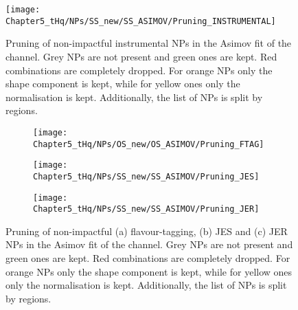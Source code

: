 \begin{figure}[h]
  \centering
  \texttt{[image: Chapter5\_tHq/NPs/SS\_new/SS\_ASIMOV/Pruning\_INSTRUMENTAL]}
   \caption{Pruning of non-impactful instrumental NPs in the Asimov fit of the \dilepSStau channel. Grey NPs are 
   not present and green ones are kept. Red combinations are completely dropped. For orange NPs only the shape 
   component is kept, while for yellow ones only the normalisation is kept. Additionally, the list of NPs is split by regions.}
  \label{fig:Appendix:AdditionalResults:SS:Asimov:Pruning:instrumental_general}
\end{figure}





\begin{figure}[h]
\begin{subfigure}{0.45\textwidth}
  \centering
  \texttt{[image: Chapter5\_tHq/NPs/OS\_new/OS\_ASIMOV/Pruning\_FTAG]}
  \caption{}
\end{subfigure}
\hfill 
\begin{subfigure}{0.45\textwidth}
  \texttt{[image: Chapter5\_tHq/NPs/SS\_new/SS\_ASIMOV/Pruning\_JES]}
  \caption{}
  \texttt{[image: Chapter5\_tHq/NPs/SS\_new/SS\_ASIMOV/Pruning\_JER]}
  \caption{}
\end{subfigure}
   \caption{Pruning of non-impactful (a) flavour-tagging, (b) JES and (c) JER NPs in the Asimov fit of the \dilepSStau channel. Grey NPs are 
   not present and green ones are kept. Red combinations are completely dropped. For orange NPs only the shape 
   component is kept, while for yellow ones only the normalisation is kept. Additionally, the list of NPs is split by regions.}
  \label{fig:Appendix:AdditionalResults:SS:Asimov:Pruning:instrumental_FTAG}
\end{figure}




